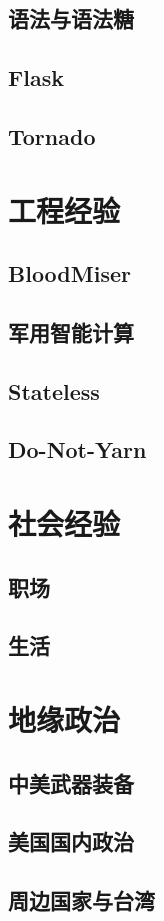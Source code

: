 \documentclass[11pt,oneside]{book}
\begin{document}
\section{语法与语法糖}
\lipsum[1-2]
\section{Flask}
\lipsum[1-2]
\section{Tornado}
\lipsum[1-2]

\chapter{工程经验}
\section{BloodMiser}
\lipsum[1-3]
\section{军用智能计算}
\lipsum[1-3]
\section{Stateless}
\lipsum[1-3]
\section{Do-Not-Yarn}
\lipsum[1-3]

\chapter{社会经验}
\section{职场}
\lipsum[1-3]
\section{生活}
\lipsum[1-3]

\chapter{地缘政治}
\section{中美武器装备}
\lipsum[1-3]
\section{美国国内政治}
\lipsum[1-3]
\section{周边国家与台湾}
\lipsum[1-3]
\end{document}
